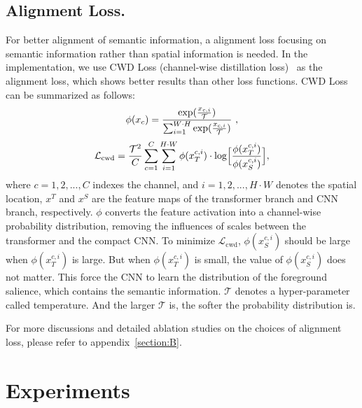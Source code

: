 \documentclass[letterpaper]{article} %
\begin{document}
\subsection{Alignment Loss.}
For better alignment of semantic information, a alignment loss focusing on semantic information rather than spatial information is needed. In the implementation, we use CWD Loss (channel-wise distillation loss)~\cite{shu2021channel} as the alignment loss, which shows better results than other loss functions. CWD Loss can be summarized as follows:
\begin{equation}
 \phi{\left(x_{c}\right) } =  \frac{\textup{exp}{(\frac{x_{c,i}}{\mathcal{T}} )}} {\sum_{i = 1}^{W\cdot H} \textup{exp}{(\frac{x_{c,i}}{\mathcal{T}} )} }~,
 \end{equation}
 \begin{equation}
 \mathcal{L}_{\text{cwd}} = \frac{\mathcal{T}^2}{C}\sum_{c = 1}^{C}\sum_{i=1}^{H\cdot W}
	\phi (x_{T}^{c,i}) \cdot \log \Bigl[
	\frac{\phi(x_{T}^{c,i})}{\phi(x_{S}^{c,i})}
	\Bigr],
	\label{eq:cw-phi}
\end{equation}
where $c = 1,2,..., C$ indexes the channel, and $ i = 1,2,..., H\cdot W$ denotes the spatial location, $x^{T}$ and $x^{S}$ are the feature maps of the transformer branch and CNN branch, respectively. $\phi$ converts the feature activation into a channel-wise probability distribution, removing the influences of scales between the transformer and the compact CNN. To minimize $ \mathcal{L}_{\text{cwd}}$, $\phi(x_{S}^{c,i})$ should be large when $\phi(x_{T}^{c,i})$ is large. But when $\phi(x_{T}^{c,i})$ is small, the value of $\phi(x_{S}^{c,i})$ does not matter. This force the CNN to learn the distribution of the foreground salience, which contains the semantic information. $\mathcal{T}$ denotes a hyper-parameter called temperature. And the larger $\mathcal{T}$ is, the softer the probability distribution is.

For more discussions and detailed ablation studies on the choices of alignment loss, please refer to appendix~\ref{section:B}.




\section{Experiments}
\end{document}

